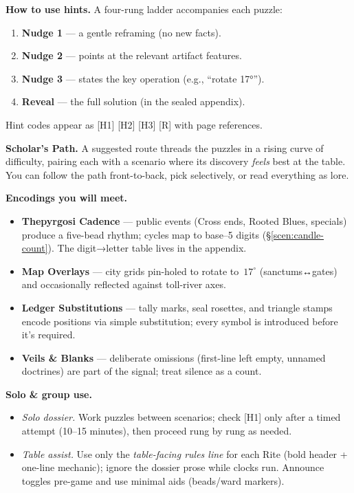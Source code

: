 \documentclass[11pt]{article}
\numberwithin{equation}{section} %
\theoremstyle{plain} %
\theoremstyle{definition} %
\theoremstyle{remark} %
\begin{document}
\medskip
\noindent\textbf{How to use hints.} A four-rung ladder accompanies each puzzle:
\begin{enumerate}\setlength\itemsep{0.25em}
  \item \textbf{Nudge 1} — a gentle reframing (no new facts).
  \item \textbf{Nudge 2} — points at the relevant artifact features.
  \item \textbf{Nudge 3} — states the key operation (e.g., “rotate 17°”).
  \item \textbf{Reveal} — the full solution (in the sealed appendix).
\end{enumerate}
Hint codes appear as \textsc{[H1] [H2] [H3] [R]} with page references.

\medskip
\noindent\textbf{Scholar’s Path.} A suggested route threads the puzzles in a rising curve of difficulty, pairing each with a scenario where its discovery \emph{feels} best at the table. You can follow the path front-to-back, pick selectively, or read everything as lore.

\medskip
\noindent\textbf{Encodings you will meet.}
\begin{itemize}\setlength\itemsep{0.3em}
  \item \textbf{Thepyrgosi Cadence} — public events (Cross ends, Rooted Blues, specials) produce a five-bead rhythm; cycles map to base–5 digits (\S\ref{scen:candle-count}). The digit→letter table lives in the appendix.
  \item \textbf{Map Overlays} — city grids pin-holed to rotate to \(\,17^\circ\) (sanctums↔gates) and occasionally reflected against toll-river axes.
  \item \textbf{Ledger Substitutions} — tally marks, seal rosettes, and triangle stamps encode positions via simple substitution; every symbol is introduced before it’s required.
  \item \textbf{Veils \& Blanks} — deliberate omissions (first-line left empty, unnamed doctrines) are part of the signal; treat silence as a count.
\end{itemize}

\medskip
\noindent\textbf{Solo \& group use.}
\begin{itemize}\setlength{\itemsep}{0.3em}
  \item \emph{Solo dossier.} Work puzzles between scenarios; check \textsc{[H1]} only after a timed attempt (10–15 minutes), then proceed rung by rung as needed.
  \item \emph{Table assist.} Use only the \emph{table-facing rules line} for each Rite (bold header + one-line mechanic); ignore the dossier prose while clocks run. Announce toggles pre-game and use minimal aids (beads/ward markers).
\end{itemize}
 
\end{document}
